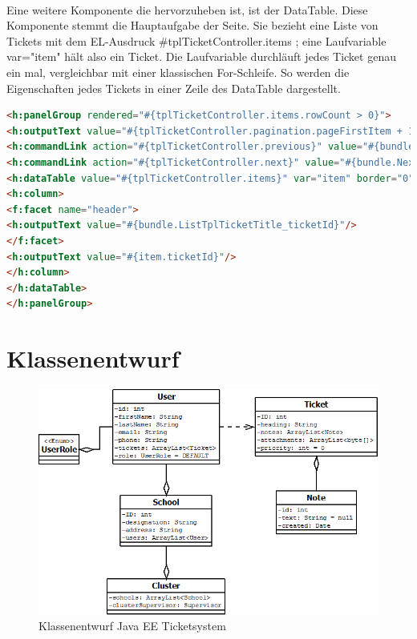 \paragraph{}
Eine weitere Komponente die hervorzuheben ist, ist der DataTable. Diese Komponente stemmt die Hauptaufgabe der Seite. Sie bezieht eine Liste von Tickets mit dem EL-Ausdruck \glqq \#{tplTicketController.items} \grqq; eine Laufvariable var="item" hält also ein Ticket. Die Laufvariable durchläuft jedes Ticket genau ein mal, vergleichbar mit einer klassischen For-Schleife. So werden die Eigenschaften jedes Tickets in einer Zeile des DataTable dargestellt.

\begin{lstlisting}[language=html, caption=List.xhtml, firstnumber=0]
<h:panelGroup rendered="#{tplTicketController.items.rowCount > 0}">
<h:outputText value="#{tplTicketController.pagination.pageFirstItem + 1}..#{tplTicketController.pagination.pageLastItem + 1}/#{tplTicketController.pagination.itemsCount}"/>&nbsp;
<h:commandLink action="#{tplTicketController.previous}" value="#{bundle.Previous} #{tplTicketController.pagination.pageSize}" rendered="#{tplTicketController.pagination.hasPreviousPage}"/>&nbsp;
<h:commandLink action="#{tplTicketController.next}" value="#{bundle.Next} #{tplTicketController.pagination.pageSize}" rendered="#{tplTicketController.pagination.hasNextPage}"/>&nbsp;
<h:dataTable value="#{tplTicketController.items}" var="item" border="0" cellpadding="2" cellspacing="0" rowClasses="jsfcrud_odd_row,jsfcrud_even_row" rules="all" style="border:solid 1px">
<h:column>
<f:facet name="header">
<h:outputText value="#{bundle.ListTplTicketTitle_ticketId}"/>
</f:facet>
<h:outputText value="#{item.ticketId}"/>
</h:column>
</h:dataTable>
</h:panelGroup>
\end{lstlisting}


\section{Klassenentwurf}

\begin{figure}[h]
	\centering
	\includegraphics[scale=0.6]{figures/klassenentwurf_java_ticketsys_export.png}
	\caption{Klassenentwurf Java EE Ticketsystem}
	\label{Abb_Klassendesign_TicketSys}
\end{figure}

